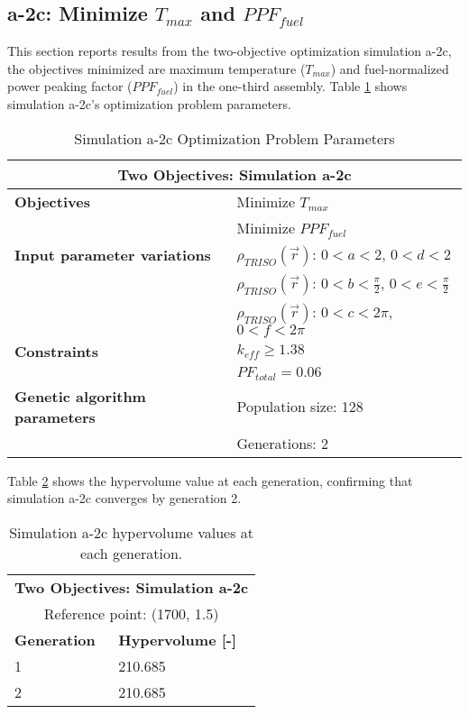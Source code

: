 \subsection{a-2c: Minimize $T_{max}$ and $PPF_{fuel}$}
\label{sec:a-2c}
This section reports results from the two-objective optimization simulation a-2c, the 
objectives minimized are maximum temperature ($T_{max}$) and fuel-normalized power 
peaking factor ($PPF_{fuel}$) in the one-third assembly.  
Table \ref{tab:simulationa2c} shows simulation a-2c's optimization problem parameters. 
\begin{table}[htbp!]
    \centering
    \onehalfspacing
    \caption{Simulation a-2c Optimization Problem Parameters}
	\label{tab:simulationa2c}
    \footnotesize
    \begin{tabular}{l|p{5.3cm}}
    \hline 
    \multicolumn{2}{c}{\textbf{Two Objectives: Simulation a-2c}} \\
    \hline 
    \textbf{Objectives} & Minimize $T_{max}$ \\
    & Minimize $PPF_{fuel}$ \\
    \hline 
    \textbf{Input parameter variations}
    & $\rho_{TRISO}(\vec{r})$: $0<a<2$, $0<d<2$\\
    & $\rho_{TRISO}(\vec{r})$: $0<b<\frac{\pi}{2}$, $0<e<\frac{\pi}{2}$\\
    & $\rho_{TRISO}(\vec{r})$: $0<c<2\pi$, $0<f<2\pi$\\
    \hline
    \textbf{Constraints} & $k_{eff} \geq 1.38$\\ 
    & $PF_{total} = 0.06$\\
    \hline 
    \textbf{Genetic algorithm parameters} & Population size: 128 \\
    & Generations: 2 \\
    \hline
    \end{tabular}
\end{table}

Table \ref{tab:a2c-hypervolume} shows the hypervolume value at each generation, 
confirming that simulation a-2c converges by generation 2. 
\begin{table}[htbp!]
    \centering
    \onehalfspacing
    \caption{Simulation a-2c hypervolume values at each generation.}
	\label{tab:a2c-hypervolume}
    \footnotesize
    \begin{tabular}{ll}
    \hline 
    \multicolumn{2}{c}{\textbf{Two Objectives: Simulation a-2c}} \\
    \multicolumn{2}{c}{Reference point: (1700, 1.5)} \\
    \hline 
    \textbf{Generation} & \textbf{Hypervolume [-]} \\
    \hline
    1 & 210.685 \\
    2 & 210.685 \\
    \hline
    \end{tabular}
\end{table}

